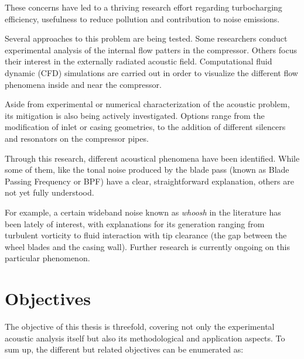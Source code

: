 These concerns have led to a thriving research effort regarding turbocharging efficiency, usefulness to reduce pollution and contribution to noise emissions.

Several approaches to this problem are being tested. Some researchers conduct experimental analysis of the internal flow patters in the compressor. Others focus their interest in the externally radiated acoustic field. Computational fluid dynamic (CFD) simulations are carried out in order to visualize the different flow phenomena inside and near the compressor.

Aside from experimental or numerical characterization of the acoustic problem, its mitigation is also being actively investigated. Options range from the modification of inlet or casing geometries, to the addition of different silencers and resonators on the compressor pipes.

Through this research, different acoustical phenomena have been identified. While some of them, like the tonal noise produced by the blade pass (known as Blade Passing Frequency or BPF) have a clear, straightforward explanation, others are not yet fully understood.

For example, a certain wideband noise known as \emph{whoosh} in the literature has been lately of interest, with explanations for its generation ranging from turbulent vorticity to fluid interaction with tip clearance (the gap between the wheel blades and the casing wall). Further research is currently ongoing on this particular phenomenon.

\section{Objectives}

The objective of this thesis is threefold, covering not only the experimental acoustic analysis itself but also its methodological and application aspects. To sum up, the different but related objectives can be enumerated as:

